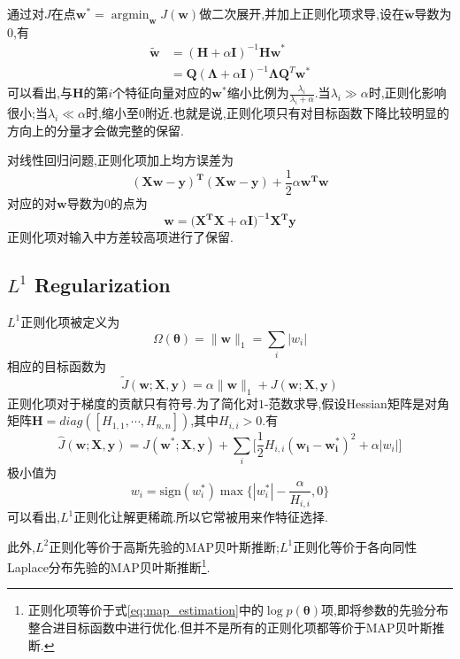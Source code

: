 通过对$J$在点$\bm w^\ast=\mathop{\arg\min}_{\bm w}J(\bm w)$做二次展开,并加上正则化项求导,设在$\tilde{\bm w}$导数为0,有
\begin{equation}\begin{split}
\tilde{\bm w}&=(\bm H+\alpha\bm I)^{-1}\bm{Hw}^\ast\\
&=\bm Q(\bm\Lambda+\alpha\bm I)^{-1}\bm\Lambda\bm Q^T\bm w^\ast
\end{split}\end{equation}
可以看出,与$\bm H$的第$i$个特征向量对应的$\bm w^\ast$缩小比例为$\frac{\lambda_i}{\lambda_i+\alpha}$.当$\lambda_i\gg\alpha$时,正则化影响很小;当$\lambda_i\ll\alpha$时,缩小至$0$附近.也就是说,正则化项只有对目标函数下降比较明显的方向上的分量才会做完整的保留.

对线性回归问题,正则化项加上均方误差为
\begin{equation}
\bm{(Xw-y)^T(Xw-y)}+\frac{1}{2}\alpha\bm{w^Tw}
\end{equation}
对应的对$\bm w$导数为$0$的点为
\begin{equation}
\bm{w=(X^TX}+\alpha\bm{I)^{-1}X^Ty}
\end{equation}
正则化项对输入中方差较高项进行了保留.

\subsection{$L^1$ Regularization}\label{sec:l1_regularization}

$L^1$正则化项被定义为
\begin{equation}
\Omega({\bm\theta})=\|\bm w\|_1=\sum_i|w_i|
\end{equation}
相应的目标函数为
\begin{equation}
\tilde J(\bm{w;X,y})=\alpha\|\bm w\|_1+J(\bm{w;X,y})
\end{equation}
正则化项对于梯度的贡献只有符号.为了简化对$1$-范数求导,假设Hessian矩阵是对角矩阵$\bm H=diag([H_{1,1},\cdots,H_{n,n}])$,其中$H_{i,i}>0$.有
\begin{equation}
\hat J(\bm{w;X,y})=J(\bm{w^\ast;X,y})+\sum_i\Big[\frac{1}{2}H_{i,i}(\bm{w_i-w_i^\ast})^2+\alpha|w_i|\Big]
\end{equation}
极小值为
\begin{equation}
w_i=\text{sign}(w_i^\ast)\max\{|w_i^\ast|-\frac{\alpha}{H_{i,i}},0\}
\end{equation}
可以看出,$L^1$正则化让解更稀疏.所以它常被用来作特征选择.

此外,$L^2$正则化等价于高斯先验的MAP贝叶斯推断;$L^1$正则化等价于各向同性Laplace分布先验的MAP贝叶斯推断\footnote{正则化项等价于式\ref{eq:map_estimation}中的$\log p({\bm\theta})$项,即将参数的先验分布整合进目标函数中进行优化.但并不是所有的正则化项都等价于MAP贝叶斯推断.}.

